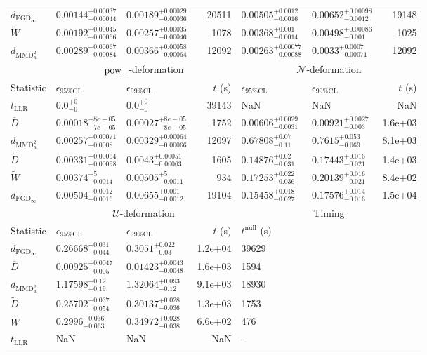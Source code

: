 \begin{tabular}{l|llr|llr}
	$d_{\mathrm{FGD}_{\infty}}$ & $0.00144_{-0.00044}^{+0.00037}$ & $0.00189_{-0.00036}^{+0.00029}$ & 20511 & $0.00505_{-0.0016}^{+0.0012}$ & $0.00652_{-0.0012}^{+0.00098}$ & 19148 \\
	$\widetilde{W}$ & $0.00192_{-0.00066}^{+0.00045}$ & $0.00257_{-0.00046}^{+0.00035}$ & 1078 & $0.00368_{-0.0014}^{+0.001}$ & $0.00498_{-0.001}^{+0.00086}$ & 1025 \\
	$d_{\mathrm{MMD}^{2}_{u}}$ & $0.00289_{-0.00084}^{+0.00067}$ & $0.00366_{-0.00064}^{+0.00058}$ & 12092 & $0.00263_{-0.00088}^{+0.00077}$ & $0.0033_{-0.00071}^{+0.0007}$ & 12092 \\
	\toprule
	\multicolumn{1}{c}{} & \multicolumn{3}{c}{$\rm{pow}_{-}$-deformation} & \multicolumn{3}{c}{$\mathcal{N}$-deformation} \\
	Statistic & $\epsilon_{95\%\mathrm{CL}}$ & $\epsilon_{99\%\mathrm{CL}}$ & $t$ (s) & $\epsilon_{95\%\mathrm{CL}}$ & $\epsilon_{99\%\mathrm{CL}}$ & $t$ (s) \\
	\midrule
	$t_{\mathrm{LLR}}$ & $0.0_{-0}^{+0}$ & $0.0_{-0}^{+0}$ & 39143 & NaN & NaN & NaN \\
	$\overline{D}$ & $0.00018_{-7e-05}^{+8e-05}$ & $0.00027_{-8e-05}^{+8e-05}$ & 1752 & $0.00606_{-0.0031}^{+0.0029}$ & $0.00921_{-0.003}^{+0.0027}$ & 1.6e+03 \\
	$d_{\mathrm{MMD}^{2}_{u}}$ & $0.00257_{-0.0008}^{+0.00071}$ & $0.00329_{-0.00066}^{+0.00064}$ & 12097 & $0.67808_{-0.11}^{+0.07}$ & $0.7615_{-0.069}^{+0.053}$ & 8.1e+03 \\
	$\widetilde{D}$ & $0.00331_{-0.00098}^{+0.00064}$ & $0.0043_{-0.00063}^{+0.00051}$ & 1605 & $0.14876_{-0.031}^{+0.02}$ & $0.17443_{-0.021}^{+0.016}$ & 1.4e+03 \\
	$\widetilde{W}$ & $0.00374_{-0.0014}^{+5}$ & $0.00505_{-0.0011}^{+5}$ & 934 & $0.17253_{-0.036}^{+0.022}$ & $0.20139_{-0.021}^{+0.016}$ & 8.4e+02 \\
	$d_{\mathrm{FGD}_{\infty}}$ & $0.00504_{-0.0016}^{+0.0012}$ & $0.00655_{-0.0012}^{+0.001}$ & 19104 & $0.15458_{-0.027}^{+0.018}$ & $0.17576_{-0.016}^{+0.014}$ & 1.5e+04 \\
	\toprule
	\multicolumn{1}{c}{} & \multicolumn{3}{c}{$\mathcal{U}$-deformation} & \multicolumn{3}{c}{Timing} \\
	Statistic & $\epsilon_{95\%\mathrm{CL}}$ & $\epsilon_{99\%\mathrm{CL}}$ & $t$ (s) & $t^{\mathrm{null}}$ (s) \\
	\midrule
	$d_{\mathrm{FGD}_{\infty}}$ & $0.26668_{-0.044}^{+0.031}$ & $0.3051_{-0.03}^{+0.022}$ & 1.2e+04 & 39629 \\
	$\overline{D}$ & $0.00925_{-0.005}^{+0.0047}$ & $0.01423_{-0.0048}^{+0.0043}$ & 1.6e+03 & 1594 \\
	$d_{\mathrm{MMD}^{2}_{u}}$ & $1.17598_{-0.19}^{+0.12}$ & $1.32064_{-0.12}^{+0.093}$ & 9.1e+03 & 18930 \\
	$\widetilde{D}$ & $0.25702_{-0.054}^{+0.037}$ & $0.30137_{-0.036}^{+0.028}$ & 1.3e+03 & 1753 \\
	$\widetilde{W}$ & $0.2996_{-0.063}^{+0.036}$ & $0.34972_{-0.038}^{+0.028}$ & 6.6e+02 & 476 \\
	$t_{\mathrm{LLR}}$ & NaN & NaN & NaN & - \\
	\bottomrule
\end{tabular}